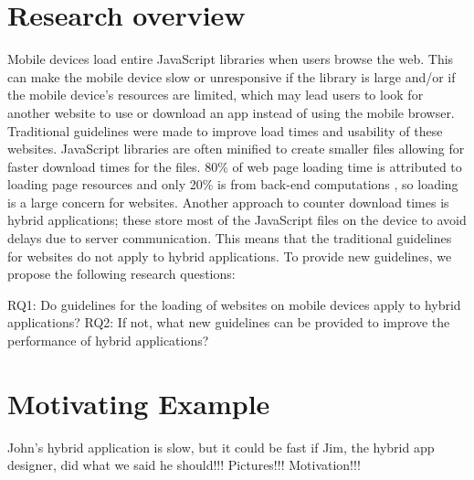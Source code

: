 \documentclass{acm_proc_article-sp}
\begin{document}
\maketitle




\section{Research overview}
Mobile devices load entire JavaScript libraries when users browse the web. This can make the mobile device slow or unresponsive if the library is large and/or if the mobile device’s resources are limited, which may lead users to look for another website to use or download an app instead of using the mobile browser. Traditional guidelines were made to improve load times and usability of these websites. JavaScript libraries are often minified to create smaller files allowing for faster download times for the files. 80\% of web page loading time is attributed to loading page resources and only 20\% is from back-end computations \cite{souders2008high}, so loading is a large concern for websites. Another approach to counter download times is hybrid applications; these store most of the JavaScript files on the device to avoid delays due to server communication. This means that the traditional guidelines for websites do not apply to hybrid applications.  To provide new guidelines, we propose the following research questions:

RQ1: Do guidelines for the loading of websites on mobile devices apply to hybrid applications?
RQ2: If not, what new guidelines can be provided to improve the performance of hybrid applications?

\section{Motivating Example}
John's hybrid application is slow, but it could be fast if Jim, the hybrid app designer, did what we said he should!!!
Pictures!!!
Motivation!!!
\end{document}
